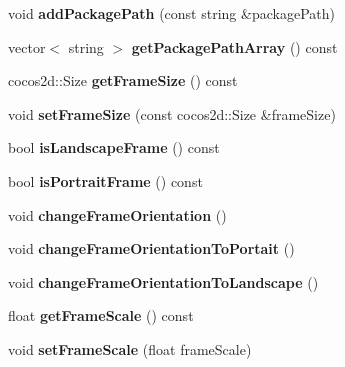 \begin{DoxyCompactItemize}
\item 
\mbox{\label{classProjectConfig_a4b3ff7de45a51524739682ce8bb5b00b}} 
void {\bfseries add\+Package\+Path} (const string \&package\+Path)
\item 
\mbox{\label{classProjectConfig_a0d2fa3221808e6ed9573f7ea781b3c07}} 
vector$<$ string $>$ {\bfseries get\+Package\+Path\+Array} () const
\item 
\mbox{\label{classProjectConfig_a5ca7f7e6efb658dd7e9d7012b4701e2e}} 
cocos2d\+::\+Size {\bfseries get\+Frame\+Size} () const
\item 
\mbox{\label{classProjectConfig_a5627810cb0f409c6258af72d5056a945}} 
void {\bfseries set\+Frame\+Size} (const cocos2d\+::\+Size \&frame\+Size)
\item 
\mbox{\label{classProjectConfig_a410e2b0ec320431d2436fbc5628d9858}} 
bool {\bfseries is\+Landscape\+Frame} () const
\item 
\mbox{\label{classProjectConfig_adc48e9230973a3add70ee74e040b01e0}} 
bool {\bfseries is\+Portrait\+Frame} () const
\item 
\mbox{\label{classProjectConfig_ae1c71b5c9816200dfd1128b0b30f4537}} 
void {\bfseries change\+Frame\+Orientation} ()
\item 
\mbox{\label{classProjectConfig_a2c84127ec4c2b57f44658b2f7397b609}} 
void {\bfseries change\+Frame\+Orientation\+To\+Portait} ()
\item 
\mbox{\label{classProjectConfig_a89f8a4caea7386cba65130d6b031cb65}} 
void {\bfseries change\+Frame\+Orientation\+To\+Landscape} ()
\item 
\mbox{\label{classProjectConfig_aa8b015a1725a29888a31b73edea79960}} 
float {\bfseries get\+Frame\+Scale} () const
\item 
\mbox{\label{classProjectConfig_aa3058024e2fb5a7c8792b3091ee67f2e}} 
void {\bfseries set\+Frame\+Scale} (float frame\+Scale)

\end{DoxyCompactItemize}
